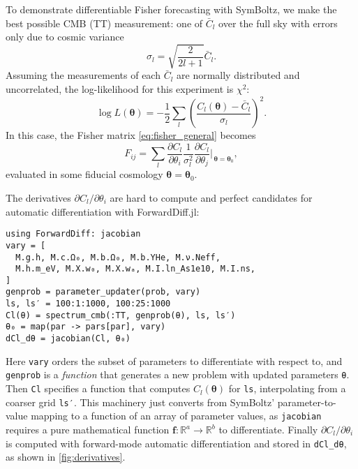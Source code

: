 \documentclass{aa}
\begin{document}
To demonstrate differentiable Fisher forecasting with SymBoltz, we make the best possible CMB (TT) measurement: one of $\bar{C}_l$ over the full sky with errors only due to cosmic variance
\begin{equation}
    \sigma_l = \sqrt{\frac{2}{2l+1}} \bar{C}_l.
\label{eq:cmb_cosmic_variance}
\end{equation}
Assuming the measurements of each $\bar{C}_l$ are normally distributed and uncorrelated, the log-likelihood for this experiment is $\chi^2$:
\begin{equation}
    \log L(\boldsymbol{\theta}) = -\frac12 \sum_l \left( \frac{C_l(\boldsymbol{\theta}) - \bar{C}_l}{\sigma_l} \right)^2.
\end{equation}
In this case, the Fisher matrix \eqref{eq:fisher_general} becomes
\begin{equation}
    F_{ij} = \sum_l \frac{\partial C_l}{\partial \theta_i} \frac{1}{\sigma_l^2} \frac{\partial C_l}{\partial \theta_j} \bigg\rvert_{\,\boldsymbol{\theta} = \boldsymbol{\theta}_0},
\label{eq:fisher_special}
\end{equation}
evaluated in some fiducial cosmology $\boldsymbol{\theta} = \boldsymbol{\theta}_0$.

The derivatives $\partial C_l / \partial \theta_i$ are hard to compute and perfect candidates for automatic differentiation with ForwardDiff.jl:
\begin{codebox}
\begin{Verbatim}
using ForwardDiff: jacobian
vary = [
  M.g.h, M.c.Ω₀, M.b.Ω₀, M.b.YHe, M.ν.Neff,
  M.h.m_eV, M.X.w₀, M.X.wₐ, M.I.ln_As1e10, M.I.ns,
]
genprob = parameter_updater(prob, vary)
ls, ls′ = 100:1:1000, 100:25:1000
Cl(θ) = spectrum_cmb(:TT, genprob(θ), ls, ls′)
θ₀ = map(par -> pars[par], vary)
dCl_dθ = jacobian(Cl, θ₀)
\end{Verbatim}
\end{codebox}
Here \texttt{vary} orders the subset of parameters to differentiate with respect to, and \texttt{genprob} is a \emph{function} that generates a new problem with updated parameters \texttt{θ}.
Then \texttt{Cl} specifies a function that computes $C_l(\boldsymbol{\theta})$ for \texttt{ls}, interpolating from a coarser grid \texttt{ls′}.
This machinery just converts from SymBoltz' parameter-to-value mapping to a function of an array of parameter values, as \texttt{jacobian} requires a pure mathematical function $\boldsymbol{f}: \mathbb{R}^a \rightarrow \mathbb{R}^b$ to differentiate.
Finally $\partial C_l / \partial \theta_i$ is computed with forward-mode automatic differentiation and stored in \texttt{dCl\_dθ}, as shown in \cref{fig:derivatives}.
\end{document}
